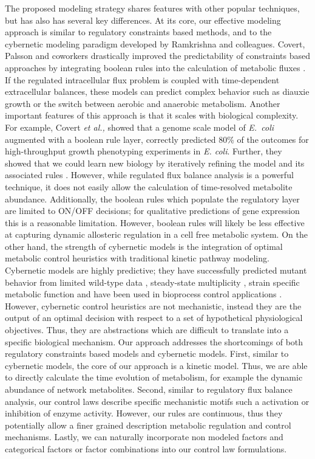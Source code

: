 \documentclass[12pt]{article}
\begin{document}
The proposed modeling strategy shares features with other popular techniques, but has also has several key differences. 
At its core, our effective modeling approach is similar to regulatory constraints based methods, and to the cybernetic modeling paradigm developed by Ramkrishna and colleagues.
Covert, Palsson and coworkers drastically improved the predictability of constraints based approaches by integrating boolean rules into the calculation of metabolic fluxes \citep{Covert:2001aa}.
If the regulated intracellular flux problem is coupled with time-dependent extracellular balances, these models can predict complex behavior such as diauxie growth or the switch between 
aerobic and anaerobic metabolism. Another important features of this approach is that it scales with biological complexity. 
For example, Covert \emph{et al.,} showed that a genome scale model of \emph{E.~coli} augmented with a boolean rule layer, 
correctly predicted 80\% of the outcomes for high-throughput growth phenotyping experiments in \emph{E. coli}.
Further, they showed that we could learn new biology by iteratively refining the model and its associated rules \citep{Covert:2004aa}. 
However, while regulated flux balance analysis is a powerful technique, it does not easily allow the calculation of time-resolved metabolite abundance. 
Additionally, the boolean rules which populate the regulatory layer are limited to ON/OFF decisions; for qualitative predictions of gene expression this is a reasonable limitation. 
However, boolean rules will likely be less effective at capturing dynamic allosteric regulation in a cell free metabolic system. 
On the other hand, the strength of cybernetic models is the integration of optimal metabolic control heuristics with traditional kinetic pathway modeling. 
Cybernetic models are highly predictive; they have successfully predicted mutant behavior from limited wild-type data \citep{1999_varner_ramkrishna_MetaEng,Varner:2000aa,Song:2012aa}, 
steady-state multiplicity \citep{2012_kim_ramkrishna_BiotechProg}, strain specific metabolic function \citep{Song:2011aa} and have been used in bioprocess control applications \citep{Gadkar:2003aa}.
However, cybernetic control heuristics are not mechanistic, instead they are the output of an optimal decision with respect to a set of hypothetical physiological objectives. 
Thus, they are abstractions which are difficult to translate into a specific biological mechanism. 
Our approach addresses the shortcomings of both regulatory constraints based models and cybernetic models. 
First, similar to cybernetic models, the core of our approach is a kinetic model. Thus, we are able to directly calculate the time evolution of metabolism, for example the dynamic abundance of 
network metabolites. Second, similar to regulatory flux balance analysis, our control laws describe specific mechanistic motifs such a activation or inhibition of enzyme activity. 
However, our rules are continuous, thus they potentially allow a finer grained description metabolic regulation and control mechanisms.
Lastly, we can naturally incorporate non modeled factors and categorical factors or factor combinations into our control law formulations.
\end{document}
